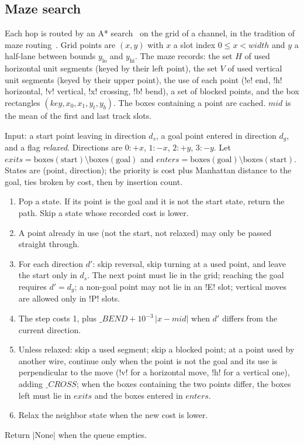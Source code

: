 \subsection{Maze search}\label{sec:pictorial-maze}

Each hop is routed by an A* search~\cite{hart1968formal} on the grid of a channel, in the
tradition of maze routing~\cite{lee1961algorithm}. Grid points are $(x, y)$ with $x$ a slot index
$0\le x<\mathit{width}$ and $y$ a half-lane between bounds $y_\text{lo}$ and $y_\text{hi}$. The
maze records: the set $H$ of used horizontal unit segments (keyed by their left point), the set
$V$ of used vertical unit segments (keyed by their upper point), the use of each point
(\code!e! end, \code!h! horizontal, \code!v! vertical, \code!x! crossing, \code!b! bend), a set of
blocked points, and the box rectangles $(\mathit{key}, x_0, x_1, y_t, y_b)$. The boxes containing
a point are cached. $\mathit{mid}$ is the mean of the first and last track slots.

\begin{algorithm}\label{alg:pictorial-maze}
Input: a start point leaving in direction $d_s$, a goal point entered in direction $d_g$, and a
flag \emph{relaxed}. Directions are $0:{+x}$, $1:{-x}$, $2:{+y}$, $3:{-y}$. Let
$\mathit{exits} = \mathrm{boxes}(\text{start})\setminus\mathrm{boxes}(\text{goal})$ and
$\mathit{enters} = \mathrm{boxes}(\text{goal})\setminus\mathrm{boxes}(\text{start})$. States are
(point, direction); the priority is cost plus Manhattan distance to the goal, ties broken by
cost, then by insertion count.
\begin{enumerate}
  \item Pop a state. If its point is the goal and it is not the start state, return the path.
    Skip a state whose recorded cost is lower.
  \item A point already in use (not the start, not relaxed) may only be passed straight through.
  \item For each direction $d'$: skip reversal, skip turning at a used point, and leave the start
    only in $d_s$. The next point must lie in the grid; reaching the goal requires $d'=d_g$; a
    non-goal point may not lie in an \code!E! slot; vertical moves are allowed only in
    \code!P! slots.
  \item The step costs 1, plus $\mathit{\_BEND} + 10^{-3}\,|x-\mathit{mid}|$ when $d'$ differs
    from the current direction.
  \item Unless relaxed: skip a used segment; skip a blocked point; at a point used by another
    wire, continue only when the point is not the goal and its use is perpendicular to the
    move (\code!v! for a horizontal move, \code!h! for a vertical one), adding
    $\mathit{\_CROSS}$; when the boxes containing the two points differ, the boxes left must lie
    in $\mathit{exits}$ and the boxes entered in $\mathit{enters}$.
  \item Relax the neighbor state when the new cost is lower.
\end{enumerate}
Return \py|None| when the queue empties.
\end{algorithm}

